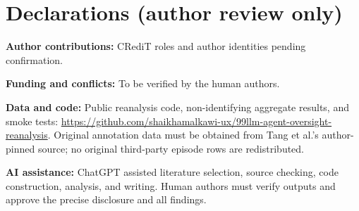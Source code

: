 \documentclass[11pt,a4paper]{article}
\begin{document}
\section*{Declarations (author review only)}
\noindent\textbf{Author contributions:} CRediT roles and author identities pending confirmation.\par
\noindent\textbf{Funding and conflicts:} To be verified by the human authors.\par
\noindent\textbf{Data and code:} Public reanalysis code, non-identifying aggregate results, and smoke tests: \url{https://github.com/shaikhamalkawi-ux/99llm-agent-oversight-reanalysis}. Original annotation data must be obtained from Tang et al.'s author-pinned source; no original third-party episode rows are redistributed.\par
\noindent\textbf{AI assistance:} ChatGPT assisted literature selection, source checking, code construction, analysis, and writing. Human authors must verify outputs and approve the precise disclosure and all findings.\par

\end{document}
